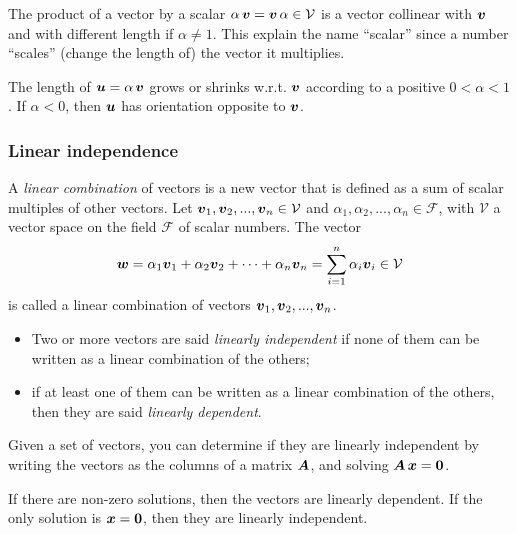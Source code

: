 The product of a vector by a scalar $\alpha\, {\mbox{\boldmath $v$}} = {\mbox{\boldmath $v$}}\, \alpha \in \mathcal{V}$ is a vector collinear with ${\mbox{\boldmath $v$}}$ and with different length if $\alpha \not= 1$. This explain the name “scalar” since a number “scales” (change the length of) the vector it multiplies. 

The length of ${\mbox{\boldmath $u$}} = \alpha\,{\mbox{\boldmath $v$}}$  grows or shrinks w.r.t. ${\mbox{\boldmath $v$}}$ according to a positive $0 < \alpha < 1$. If $\alpha < 0$, then ${\mbox{\boldmath $u$}}$ has orientation opposite to ${\mbox{\boldmath $v$}}$.

%


\subsubsection*{Linear independence}

A \emph{linear combination} of vectors is a new vector that is defined as a sum of scalar multiples of other vectors.
Let ${\mbox{\boldmath $v$}}_1, {\mbox{\boldmath $v$}}_2,..., {\mbox{\boldmath $v$}}_n \in \mathcal{V}$ and $\alpha_1, \alpha_2,...,\alpha_n \in \mathcal{F}$, with $\mathcal{V}$ a vector
space on the field $\mathcal{F}$ of scalar numbers. The vector 
\[
{\mbox{\boldmath $w$}} = \alpha_1 {\mbox{\boldmath $v$}}_1 + \alpha_2 {\mbox{\boldmath $v$}}_2 + \cdots + \alpha_n {\mbox{\boldmath $v$}}_n = \sum^n_{i=1}
	\alpha_i {\mbox{\boldmath $v$}}_i \in \mathcal{V}
\]
is called a linear combination of vectors ${\mbox{\boldmath $v$}}_1, {\mbox{\boldmath $v$}}_2,..., {\mbox{\boldmath $v$}}_n$.

\begin{itemize}
\item Two or more vectors are said \emph{linearly independent} if none of them can be written as a linear combination of the others;
\item if at least one of them can be written as a linear combination of the others, then they are said \emph{linearly dependent}.
\end{itemize}

Given a set of vectors, you can determine if they are linearly independent by writing the vectors as the columns of a matrix ${\mbox{\boldmath $A$}}$, and solving ${\mbox{\boldmath $A$}}\,{\mbox{\boldmath $x$}} = {\mbox{\boldmath $0$}}$. 

If there are non-zero solutions, then the vectors are linearly dependent. If the only solution is ${\mbox{\boldmath $x$}} = {\mbox{\boldmath $0$}}$, then they are linearly independent.

